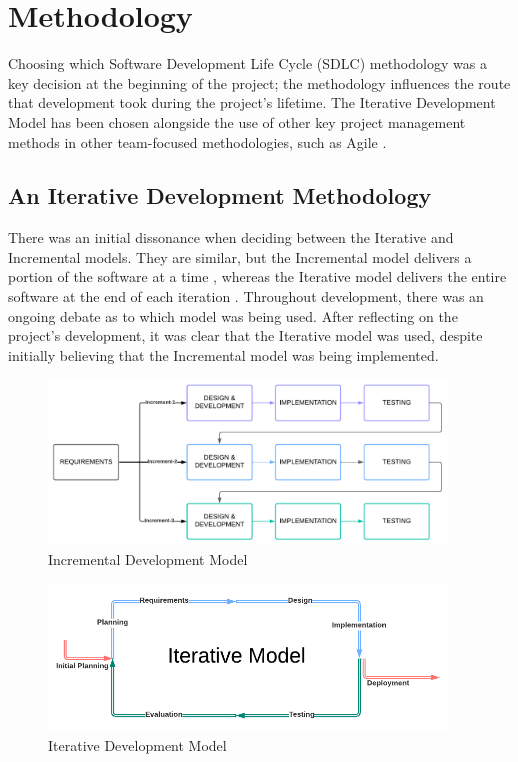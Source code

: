 \chapter{Methodology}
\label{chap:methodology}

Choosing which Software Development Life Cycle (SDLC) methodology was a key decision at the beginning of the project; the methodology influences the route that development took during the project's lifetime. The Iterative Development Model has been chosen alongside the use of other key project management methods in other team-focused methodologies, such as Agile .

\section{An Iterative Development Methodology}
\label{methodology:chosen}

There was an initial dissonance when deciding between the Iterative and Incremental models. They are similar, but the Incremental model delivers a portion of the software at a time , whereas the Iterative model delivers the entire software at the end of each iteration . Throughout development, there was an ongoing debate as to which model was being used. After reflecting on the project's development, it was clear that the Iterative model was used, despite initially believing that the Incremental model was being implemented. 

\begin{figure}
    \centering
    \includegraphics[width=400px]{figures/incremental-model.pdf}
    \caption{Incremental Development Model}
    \label{fig:incremental}
\end{figure}

\begin{figure}
    \centering
    \includegraphics[width=400px]{figures/iterative-model.pdf}
    \caption{Iterative Development Model}
    \label{fig:iterative}
\end{figure}

